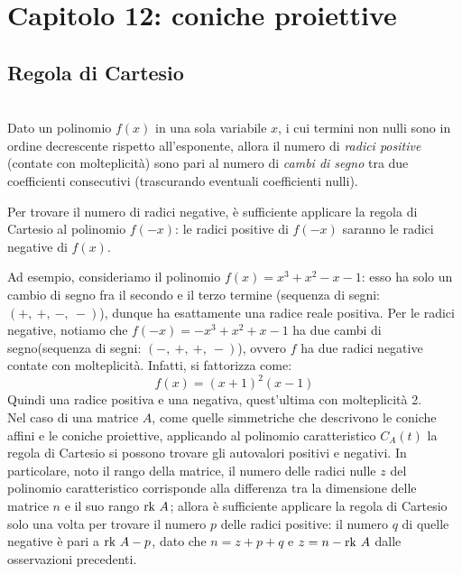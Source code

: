 \section{Capitolo 12: coniche proiettive}
\subsection{Regola di Cartesio}\label{Cartesioquellodeibidonidellacarta}
\begin{theorema}~{}\\
	Dato un polinomio $f\left(x\right)$ in una sola variabile $x$, i cui termini non nulli sono in ordine decrescente rispetto all'esponente, allora il numero di \textit{radici positive} (contate con molteplicità) sono pari al numero di \textit{cambi di segno} tra due coefficienti consecutivi (trascurando eventuali coefficienti nulli).
\end{theorema}
\begin{tips}
	Per trovare il numero di radici negative, è sufficiente applicare la regola di Cartesio al polinomio $f\left(-x\right)$: le radici positive di $f\left(-x\right)$ saranno le radici negative di $f\left(x\right)$.
\end{tips}
Ad esempio, consideriamo il polinomio $f\left(x\right)=x^3+x^2-x-1$: esso ha solo un cambio di segno fra il secondo e il terzo termine (sequenza di segni: $\left(+,\ +,\ -,\ -\right)$), dunque ha esattamente una radice reale positiva. Per le radici negative, notiamo che $f\left(-x\right)=-x^3+x^2+x-1$ ha due cambi di segno(sequenza di segni: $\left(-,\ +,\ +,\ -\right)$), ovvero $f$ ha due radici negative contate con molteplicità. Infatti, si fattorizza come:
\begin{equation*}
	f\left(x\right)=\left(x+1\right)^2\left(x-1\right)
\end{equation*}
Quindi una radice positiva e una negativa, quest'ultima con molteplicità 2.\\
Nel caso di una matrice $A$, come quelle simmetriche che descrivono le coniche affini e le coniche proiettive, applicando al polinomio caratteristico $C_A\left(t\right)$ la regola di Cartesio si possono trovare gli autovalori positivi e negativi.
In particolare, noto il rango della matrice, il numero delle radici nulle $z$ del polinomio caratteristico corrisponde alla differenza tra la dimensione delle matrice $n$ e il suo rango $\mathrm{rk}\  A$; allora è sufficiente applicare la regola di Cartesio solo una volta per trovare il numero $p$ delle radici positive: il numero $q$ di quelle negative è pari a $\mathrm{rk}\  A - p$, dato che $n=z+p+q$ e $z=n-\mathrm{rk}\  A$ dalle osservazioni precedenti.

